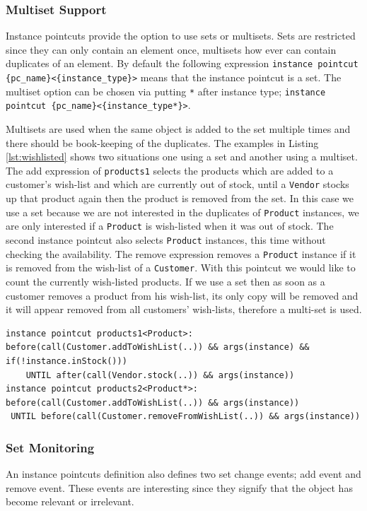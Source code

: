 \documentclass{llncs}
\begin{document}
\subsubsection{Multiset Support}
Instance pointcuts provide the option to use sets or multisets. Sets are restricted since they can only contain an element once, multisets how ever can contain duplicates of an element. By default the following expression \lstinline!instance pointcut {pc_name}<{instance_type}>! means that the instance pointcut is a set. The multiset option can be chosen via putting \texttt{*} after instance type; \lstinline!instance pointcut {pc_name}<{instance_type*}>!.

Multisets are used when the same object is added to the set multiple times and there should be book-keeping of the duplicates. The examples in Listing \ref{lst:wishlisted} shows two situations one using a set and another using a multiset. The add expression of \texttt{products1} selects the products which are added to a customer's wish-list and which are currently out of stock, until a \texttt{Vendor} stocks up that product again then the product is removed from the set. In this case we use a set because we are not interested in the duplicates of \texttt{Product} instances, we are only interested if a \texttt{Product} is wish-listed when it was out of stock. The second instance pointcut also selects \texttt{Product} instances, this time without checking the availability. The remove expression removes a \texttt{Product} instance if it is removed from the wish-list of a \texttt{Customer}. With this pointcut we would like to count the currently wish-listed products. If we use a set then as soon as a customer removes a product from his wish-list, its only copy will be removed and it will appear removed from all customers' wish-lists, therefore a multi-set is used. 

\begin{lstlisting}[float=h!, caption={Two instance pointcuts, each maintains a set of wish-listed products}, label={lst:wishlisted}]
instance pointcut products1<Product>: 
before(call(Customer.addToWishList(..)) && args(instance) && if(!instance.inStock())) 
	UNTIL after(call(Vendor.stock(..)) && args(instance))
instance pointcut products2<Product*>: 
before(call(Customer.addToWishList(..)) && args(instance))
 UNTIL before(call(Customer.removeFromWishList(..)) && args(instance))
\end{lstlisting}

\subsubsection{Set Monitoring}
An instance pointcuts definition also defines two set change events; add event and remove event. These events are interesting since they signify that the object has become relevant or irrelevant.
\end{document}
